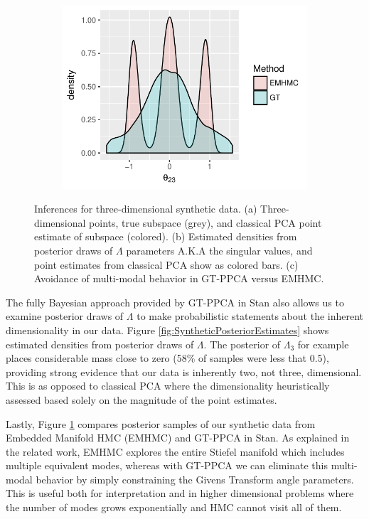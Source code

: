 \documentclass{article}
\begin{document}
\begin{figure}
    ~ %
    \begin{subfigure}[b]{0.3\textwidth}
        \includegraphics[width=\textwidth]{multiModal.pdf}
        \caption{}
        \label{fig:multiModal}
    \end{subfigure}
    \caption{Inferences for three-dimensional synthetic data. (a) Three-dimensional points, true subspace (grey), and classical PCA point estimate of subspace (colored). (b) Estimated densities from posterior draws of $\Lambda$ parameters A.K.A  the singular values, and point estimates from classical PCA show as colored bars. (c) Avoidance of multi-modal behavior in GT-PPCA versus EMHMC.}\label{fig:synthetic}
\end{figure}

The fully Bayesian approach provided by GT-PPCA in Stan also allows us to examine posterior draws of $\Lambda$ to make probabilistic statements about the inherent dimensionality in our data. Figure \ref{fig:SyntheticPosteriorEstimates} shows estimated densities from posterior draws of $\Lambda$. The posterior of $\Lambda_3$ for example places considerable mass close to zero (58\% of samples were less that 0.5), providing strong evidence that our data is inherently two, not three, dimensional. This is as opposed to classical PCA where the dimensionality heuristically assessed based solely on the magnitude of the point estimates.

Lastly, Figure \ref{fig:multiModal} compares posterior samples of our synthetic data from Embedded Manifold HMC (EMHMC) and GT-PPCA in Stan. As explained in the related work, EMHMC explores the entire Stiefel manifold which includes multiple equivalent modes, whereas with GT-PPCA we can eliminate this multi-modal behavior by simply constraining the Givens Transform angle parameters. This is useful both for interpretation and in higher dimensional problems where the number of modes grows exponentially and HMC cannot visit all of them. 
\end{document}
